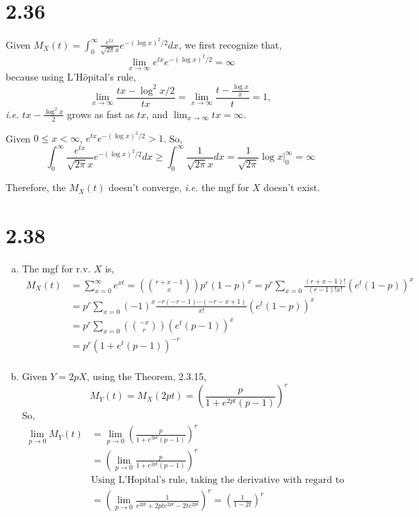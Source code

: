 \documentclass[letterpaper]{article}
\begin{document}
    \section*{2.36}
    Given 
    $M_X(t) = \int_0^\infty \frac{e^{tx}}{\sqrt{2\pi}x} e^{-(\log x)^2/2} dx$, we first recognize that, 
    \[
    \lim_{x \to \infty} e^{tx}e^{-(\log x)^2/2} = \infty
    \]
    because using L'H$\hat o$pital's rule,
    \[
    \lim_{x \to \infty} \frac{tx - \log^2x/2}{tx} = \lim_{x \to \infty} \frac{t-\frac{\log x}{x}}{t} = 1,
    \]
    \emph{i.e.} $tx - \frac{\log^2 x}{2}$ grows as fast as $tx$, and $\lim_{x \to \infty} tx = \infty$. 

    Given $0 \le x < \infty$, $e^{tx}e^{-(\log x)^2/2} > 1$. So,
    \[
    \int_0^\infty \frac{e^{tx}}{\sqrt{2\pi}x} e^{-(\log x)^2/2} dx \ge
    \int_0^\infty \frac{1}{\sqrt{2\pi}x} dx = \frac{1}{\sqrt{2 \pi}} \log x|^\infty_0 = \infty
    \]
    
    Therefore, the $M_X(t)$ doesn't converge, \emph{i.e.} the mgf for $X$ doesn't exist.
    \section*{2.38}
    \begin{enumerate}[(a)]
    \item
    The mgf for r.v. $X$ is, 
    \begin{align*}
    M_X(t) &= \sum_{x=0}^\infty e^{xt} = \left(r+x-1 \choose x\right) p^r (1-p)^x 
    = p^r \sum_{x=0} \frac{(r+x-1)!}{(r-1)!x!} \left(e^t(1-p)\right)^x \\
    & = p^r \sum_{x=0} (-1)^x \frac{-r(-r-1)\cdots(-r-x+1)}{x!} \left(e^t(1-p)\right)^x \\
    & = p^r \sum_{x=0} \left(-x \choose r\right) \left(e^t(p-1)\right)^x \\
    & = p^r\left(1+e^t(p-1)\right)^{-r} \\
    \end{align*}
    \item Given $Y=2pX$, using the Theorem, 2.3.15,
    \[
    M_Y(t) = M_X(2pt) = \left(\frac{p}{1+e^{2pt}(p-1)}\right)^r
    \]
    So,
    \begin{align*}
    \lim_{p \to 0} M_Y(t) & = \lim_{p \to 0} \left(\frac{p}{1+e^{2pt}(p-1)}\right)^r \\
    & = \left(\lim_{p \to 0} \frac{p}{1+e^{2pt}(p-1)}\right)^r \\
    & \text{Using L'Hopital's rule, taking the derivative with regard to p on both numerator and denominator,}\\
    & = \left(\lim_{p \to 0} \frac{1}{e^{2pt} + 2pte^{2pt} - 2t e^{2pt}}\right)^r = \left(\frac{1}{1-2t} \right)^r
    \end{align*}
    \end{enumerate}
\end{document}
